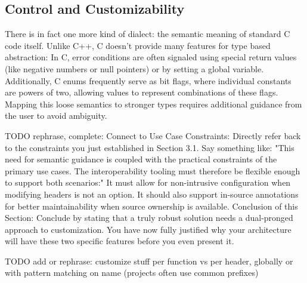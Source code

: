 \subsection{Control and Customizability}
There is in fact one more kind of dialect: the semantic meaning of standard C code itself. Unlike C++, C doesn't provide many features for type based abstraction: In C, error conditions are often signaled using special return values (like negative numbers or null pointers) or by setting a global variable. Additionally, C enums frequently serve as bit flags, where individual constants are powers of two, allowing values to represent combinations of these flags. Mapping this loose semantics to stronger types requires additional guidance from the user to avoid ambiguity.



TODO rephrase, complete: Connect to Use Case Constraints: Directly refer back to the constraints you just established in Section 3.1. Say something like: "This need for semantic guidance is coupled with the practical constraints of the primary use cases. The interoperability tooling must therefore be flexible enough to support both scenarios:"
It must allow for non-intrusive configuration when modifying headers is not an option.
It should also support in-source annotations for better maintainability when source ownership is available.
Conclusion of this Section: Conclude by stating that a truly robust solution needs a dual-pronged approach to customization. You have now fully justified why your architecture will have these two specific features before you even present it.

TODO add or rephrase: customize stuff per function vs per header, globally or with pattern matching on name (projects often use common prefixes)

